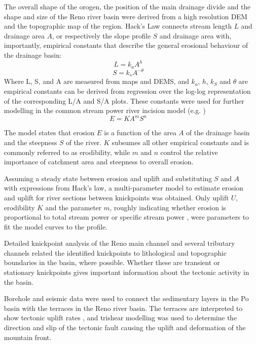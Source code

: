 \documentclass[11pt]{article}
\begin{document}
The overall shape of the orogen, the position of the main drainage divide and the shape and size 
of the Reno river basin were derived from a high resolution DEM and the topographic map of the region.
Hack's Law \parencite{hack1957studies} connects stream length $L$ and drainage area $A$, or respectively
the slope profile $S$ and drainage area with, importantly, empirical constants that
describe the general erosional behaviour of the drainage basin:
\begin{equation}
    L = k_aA^h
\end{equation}
\begin{equation}
    S = k_sA^{-\theta}
\end{equation}
Where L, S, and A are measured from maps and DEMS, and $k_a$, $h$, $k_S$ and $\theta$ are empirical constants
can be derived from regression over the log-log representation of the corresponding L/A and S/A plots.
These constants were used for further modelling in the common stream power river incision model (e.g. \textcite{burbank-anderson-2nd-2016})
\begin{equation}
    E = KA^mS^n
\end{equation} 

The model states that erosion $E$ is a function of the area $A$ of the drainage basin and the steepness $S$ of
the river. $K$ subsumes all other empirical constants and is commonly referred to as erodibility, while $m$ and $n$
control the relative importance of catchment area and steepness to overall erosion.

Assuming a steady state between erosion and uplift \parencite{whipple-1999} and substituting $S$ and $A$
with expressions from Hack's law, a multi-parameter
model to estimate erosion and uplift for river sections between knickpoints was obtained. Only uplift $U$, 
erodibility $K$ and the parameter $m$, roughly indicating whether erosion is proportional to total stream power
or specific stream power \parencite{burbank-anderson-2nd-2016}, were parameters to fit the model curves to the profile.

Detailed knickpoint analysis of the Reno main channel and several tributary channels related the identified
knickpoints to lithological and topographic boundaries in the basin, where possible.
Whether these are transient or stationary knickpoints gives important information about the tectonic
activity in the basin.

Borehole and seismic data were used to connect the sedimentary layers in the Po basin with the terraces
in the Reno river basin. The terraces are interpreted to show tectonic uplift rates \parencite{burbank-anderson-2nd-2016},
and trishear modelling \parencite{erslev_trishear_1991} was used to determine 
the direction and slip of the tectonic fault causing the uplift and deformation of the mountain front.
\end{document}
